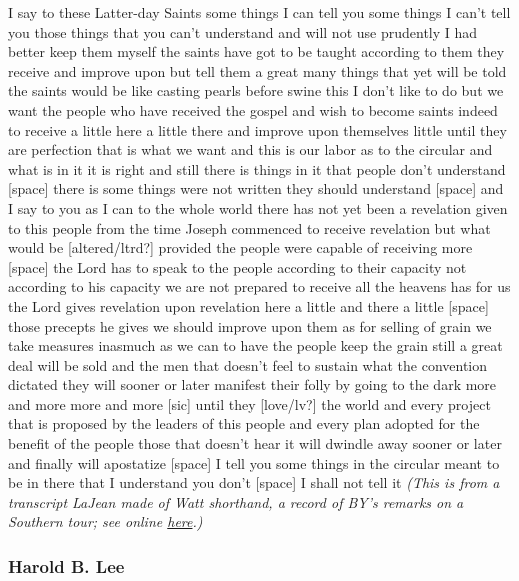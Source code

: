 \begin{compactdesc}
			\item[7 September 1864] I say to these Latter-day Saints some things I can tell you some things I can't tell you those things that you can't understand and will not use prudently I had better keep them myself the saints have got to be taught according to them they receive and improve upon but tell them a great many things that yet will be told the saints would be like casting pearls before swine this I don't like to do but we want the people who have received the gospel and wish to become saints indeed to receive a little here a little there and improve upon themselves little until they are perfection that is what we want and this is our labor as to the circular and what is in it it is right and still there is things in it that people don't understand [space] there is some things were not written they should understand [space] and I say to you as I can to the whole world there has not yet been a revelation given to this people from the time Joseph commenced to receive revelation but what would be [altered/ltrd?] provided the people were capable of receiving more [space] the Lord has to speak to the people according to their capacity not according to his capacity we are not prepared to receive all the heavens has for us the Lord gives revelation upon revelation here a little and there a little [space] those precepts he gives we should improve upon them as for selling of grain we take measures inasmuch as we can to have the people keep the grain still a great deal will be sold and the men that doesn't feel to sustain what the convention dictated they will sooner or later manifest their folly by going to the dark more and more more and more [sic] until they [love/lv?] the world and every project that is proposed by the leaders of this people and every plan adopted for the benefit of the people those that doesn't hear it will dwindle away sooner or later and finally will apostatize [space] I tell you some things in the circular meant to be in there that I understand you don't [space] I shall not tell it \textit{(This is from a transcript LaJean made of Watt shorthand, a record of BY's remarks on a Southern tour; see online \href{https://catalog.churchofjesuschrist.org/assets/92e3ef48-c3c0-4d38-85d9-96e90d2b4fc6/0/0}{here}.)}
			
		\end{compactdesc}
		
	\subsubsection{Harold B. Lee} %
		\label{EPIST-REVELATION-LEE}
	
